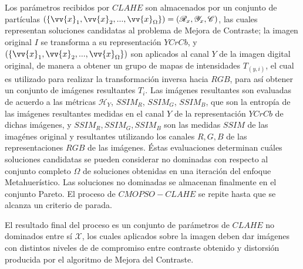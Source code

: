                 Los parámetros recibidos por $CLAHE$ son almacenados por un conjunto de partículas $(\{\vv{x}_1, \vv{x}_2,...,\vv{x}_{\Omega}\})=(\mathscr{R}_x,\mathscr{Y}_x,\mathscr{C})$, las cuales representan soluciones candidatas al problema de Mejora de Contraste; la imagen original $I$ se transforma a su representación $YCrCb$, y $(\{\vv{x}_1, \vv{x}_2,...,\vv{x}_{\Omega}\})$ son aplicados al canal $Y$ de la imagen digital original, de manera a obtener un grupo de mapas  de intensidades $T_(y,i)$, el cual es utilizado para realizar la transformación inversa hacia $RGB$, para así obtener un conjunto de imágenes resultantes $T_i$. 
                Las imágenes resultantes son evaluadas de acuerdo a las métricas $\mathscr{H}_Y$, $SSIM_R$, $SSIM_G$, $SSIM_B$, que son la entropía de las imágenes resultantes medidas en el canal $Y$ de la representación $YCrCb$ de dichas imágenes, y $SSIM_R,SSIM_G,SSIM_B$ son las medidas $SSIM$ de las imagénes original y resultantes utilizando los canales $R,G,B$ de las representaciones $RGB$ de las imágenes. Éstas evaluaciones determinan cuáles soluciones candidatas se pueden considerar no dominadas con respecto al conjunto completo $\Omega$ de soluciones obtenidas en una iteración del enfoque Metahuerístico. Las soluciones no dominadas se almacenan finalmente en el conjunto Pareto. El proceso de $CMOPSO-CLAHE$ se repite hasta que se alcanza un criterio de parada.

                El resultado final del proceso es un conjunto de parámetros de $CLAHE$ no dominados entre sí $\mathscr{X}$\label{symbol:nodominadas}, los cuales aplicados sobre la imagen deben dar imágenes con distintos niveles de de compromiso entre contraste obtenido y distorsión producida por el algoritmo de Mejora del Contraste.  



